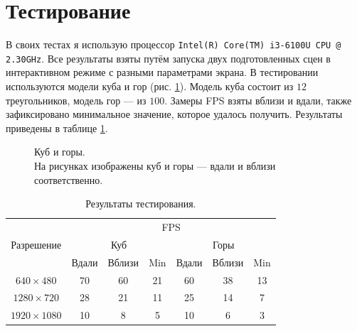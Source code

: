 \documentclass{article}
\begin{document}
\newpage

\section{Тестирование}

В своих тестах я использую процессор \verb"Intel(R) Core(TM) i3-6100U CPU @ 2.30GHz".
Все результаты взяты путём запуска двух подготовленных сцен в интерактивном режиме с разными параметрами экрана.
В тестировании используются модели куба и гор (рис. \ref{rendered models}).
Модель куба состоит из $12$ треугольников, модель гор --- из $100$.
Замеры FPS взяты вблизи и вдали, также зафиксировано минимальное значение, которое удалось получить.
Результаты приведены в таблице \ref{testing results}.

\begin{figure}[ht]
    \caption{Куб и горы. \\ На рисунках изображены куб и горы --- вдали и вблизи соответственно. }
    \label{rendered models}
\end{figure}

\begin{table}[ht]
	\begin{center}
	\begin{tabular}{|c|c|c|c|c|c|c|} \hline
		\multirow{3}{*}{Разрешение}
		& \multicolumn{6}{|c|}{FPS} \\ \cline{2-7}
		& \multicolumn{3}{|c|}{Куб} & \multicolumn{3}{|c|}{Горы} \\ \cline{2-7}
		& Вдали & Вблизи & Min & Вдали & Вблизи & Min \\ \hline
		$640 \times 480$ & 70 & 60 & 21 & 60 & 38 & 13 \\ \hline
		$1280 \times 720$ & 28 & 21 & 11 & 25 & 14 & 7 \\ \hline
		$1920 \times 1080$ & 10 & 8 & 5 & 10 & 6 & 3 \\ \hline
	\end{tabular}
	\end{center}
	\caption{Результаты тестирования.}
	\label{testing results}
\end{table}
\end{document}
